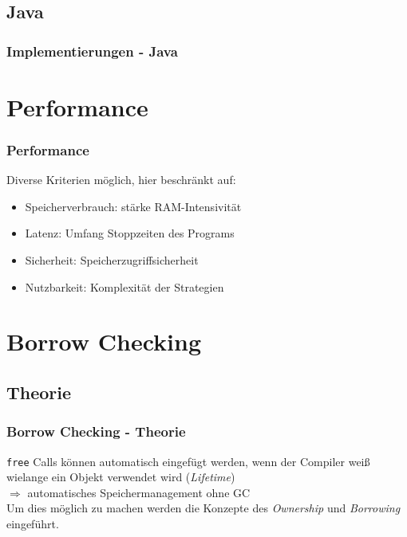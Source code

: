 \documentclass{beamer}
\begin{document}
        \subsection{Java}
            \begin{frame}
                \frametitle{Implementierungen - Java}
            \end{frame}

    \section{Performance}
        \begin{frame}
            \frametitle{Performance}

            Diverse Kriterien möglich, hier beschränkt auf:

            \begin{itemize}
                \item Speicherverbrauch: stärke RAM-Intensivität
                \item Latenz: Umfang Stoppzeiten des Programs
                \item Sicherheit: Speicherzugriffsicherheit
                \item Nutzbarkeit: Komplexität der Strategien
            \end{itemize}
        \end{frame}
        
    \section{Borrow Checking}

        \subsection{Theorie}
        \begin{frame}
            \frametitle{Borrow Checking - Theorie}

            \texttt{free} Calls können automatisch eingefügt werden, wenn der Compiler weiß wielange ein Objekt verwendet wird (\textit{Lifetime})\\
            $\Rightarrow$ automatisches Speichermanagement ohne GC\\
            Um dies möglich zu machen werden die Konzepte des \textit{Ownership} und \textit{Borrowing} eingeführt.
        \end{frame}
\end{document}
